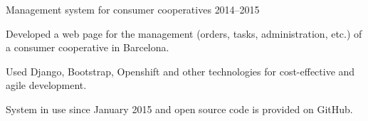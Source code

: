 

\begin{cventries}

  \cventrynorole
    {Management system for consumer cooperatives} %
    {} %
    {2014--2015} %
    {
      \begin{cvitems} %
        \item {Developed a web page for the management (orders, tasks, administration, etc.) of a consumer cooperative in Barcelona.}
        \item {Used Django, Bootstrap, Openshift and other technologies for cost-effective and agile development.}
        \item {System in use since January 2015 and open source code is provided on GitHub.}
      \end{cvitems}
    }

\end{cventries}
